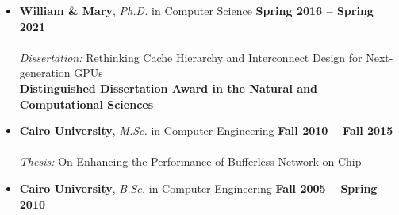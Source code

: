 \documentclass[10pt,a4]{article}
\begin{document}
\begin{itemize}

\item{\bf William \& Mary}, {\it Ph.D.} in Computer Science \hfill {\bf Spring 2016 -- Spring 2021} \\
\vspace{-0.3cm}\\
{\it Dissertation:} Rethinking Cache Hierarchy and Interconnect Design for Next-generation GPUs \\
{\bf Distinguished Dissertation Award in the Natural and Computational Sciences}

\item{\bf Cairo University}, {\it M.Sc.} in Computer Engineering \hfill {\bf Fall 2010 -- Fall 2015} \\
\vspace{-0.3cm}\\
{\it Thesis:} On Enhancing the Performance of Bufferless Network-on-Chip 

\item{\bf Cairo University}, {\it B.Sc.} in Computer Engineering \hfill {\bf Fall 2005 -- Spring 2010} 

\end{itemize}
\end{document}
